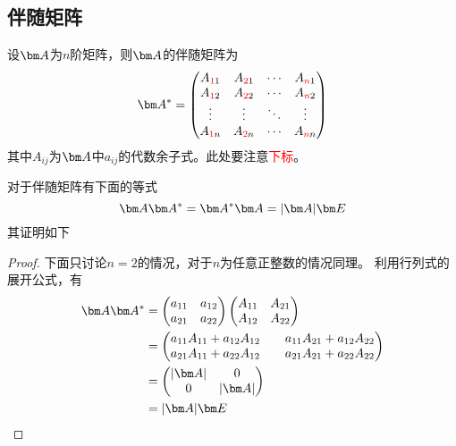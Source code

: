 \subsection{伴随矩阵}
\begin{definition}
    设$\mat{A}$为$n$阶矩阵，则$\mat{A}$的伴随矩阵为
    \[
        \mat{A}^* =
        \begin{pmatrix}
            A_{\textcolor{red}{1}1} & A_{\textcolor{red}{2}1} & \cdots & A_{\textcolor{red}{n}1} \\
            A_{\textcolor{red}{1}2} & A_{\textcolor{red}{2}2} & \cdots & A_{\textcolor{red}{n}2} \\
            \vdots                  & \vdots                  & \ddots & \vdots                  \\
            A_{\textcolor{red}{1}n} & A_{\textcolor{red}{2}n} & \cdots & A_{\textcolor{red}{n}n} \\
        \end{pmatrix}
    \]
    其中$A_{ij}$为$\mat{A}$中$a_{ij}$的代数余子式。此处要注意\textcolor{red}{下标}。
\end{definition}
对于伴随矩阵有下面的等式
\begin{equation}
    \mat{A}\mat{A}^* = \mat{A}^*\mat{A} = |\mat{A}|\mat{E}
\end{equation}
其证明如下
\begin{proof}
    下面只讨论$n=2$的情况，对于$n$为任意正整数的情况同理。
    利用行列式的展开公式，有
    \begin{align*}
        \mat{A}\mat{A}^* & =
        \begin{pmatrix}
            a_{11} & a_{12} \\
            a_{21} & a_{22}
        \end{pmatrix}
        \begin{pmatrix}
            A_{11} & A_{21} \\
            A_{12} & A_{22}
        \end{pmatrix}            \\
                         & =
        \begin{pmatrix}
            a_{11}A_{11} + a_{12}A_{12} &  & a_{11}A_{21} + a_{12}A_{22} \\
            a_{21}A_{11} + a_{22}A_{12} &  & a_{21}A_{21} + a_{22}A_{22}
        \end{pmatrix}            \\
                         & =
        \begin{pmatrix}
            |\mat{A}| & 0         \\
            0         & |\mat{A}|
        \end{pmatrix}            \\
                         & = |\mat{A}|\mat{E}
    \end{align*}
\end{proof}

